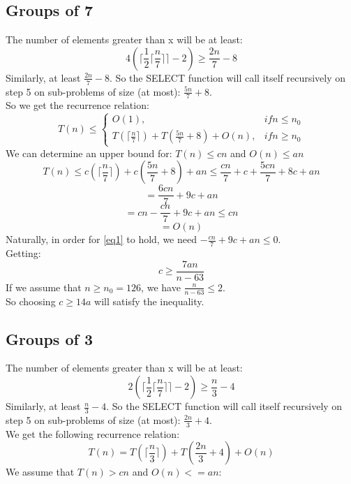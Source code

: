 \subsection*{Groups of 7}
The number of elements greater than x will be at least:
\begin{equation*}
	4(\lceil \frac{1}{2} \lceil \frac{n}{7} \rceil \rceil -2) \geq \frac{2n}{7} - 8
\end{equation*}
Similarly, at least $\frac{2n}{7} - 8$. So the SELECT function will call itself recursively on step 5 on sub-problems of size (at most): $\frac{5n}{7} + 8$.\\

So we get the recurrence relation:
\begin{equation*}
	T(n) \leq \begin{cases} O(1), & if n \leq n_0\\ T(\lceil \frac{n}{7} \rceil) + T(\frac{5n}{7} + 8) + O(n), &if n \geq n_0\end{cases}
\end{equation*}
We can determine an upper bound for: $T(n) \leq cn$  and $O(n) \leq an$
\begin{equation*}
	T(n) \leq c(\lceil \frac{n}{7} \rceil) + c(\frac{5n}{7} + 8) + an \leq \frac{cn}{7} + c + \frac{5cn}{7} + 8c + an
\end{equation*}
\begin{equation*}
	= \frac{6cn}{7} + 9c + an
\end{equation*}
\begin{equation}\label{eq1}
	= cn - \frac{cn}{7} + 9c + an \leq cn
\end{equation}
\begin{equation*}
	= O(n)
\end{equation*}
Naturally, in order for \ref{eq1} to hold, we need $- \frac{cn}{7} + 9c + an \leq 0$.\\
Getting:
\begin{equation*}
	c \geq \frac{7an}{n-63}
\end{equation*}
If we assume that $n \geq n_0 = 126$, we have $\frac{n}{n - 63} \leq 2$.\\
So choosing $c \geq 14a$ will satisfy the inequality.
\subsection*{Groups of 3}
The number of elements greater than x will be at least:
\begin{equation*}
	2(\lceil \frac{1}{2} \lceil \frac{n}{7} \rceil \rceil -2) \geq \frac{n}{3} - 4
\end{equation*}
Similarly, at least $\frac{n}{3} - 4$. So the SELECT function will call itself recursively on step 5 on sub-problems of size (at most): $\frac{2n}{3} + 4$.\\
We get the following recurrence relation:
\begin{equation*}
	T(n) = T(\lceil \frac{n}{3} \rceil) + T(\frac{2n}{3} + 4) + O(n)
\end{equation*}
We assume that $T(n) > cn$ and $O(n) <= an$:


	
